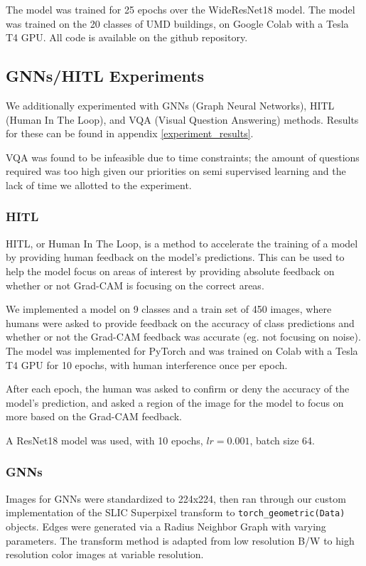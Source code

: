 \documentclass{article}
\begin{document}
The model was trained for 25 epochs over the WideResNet18 model. The model was trained on the 20 classes of UMD buildings, on Google Colab with a Tesla T4 GPU. All code is available on the github repository.

\subsection{GNNs/HITL Experiments}

We additionally experimented with GNNs (Graph Neural Networks), HITL (Human In The Loop), and VQA (Visual Question Answering) methods. Results for these can be found in appendix \ref{experiment_results}.

VQA was found to be infeasible due to time constraints; the amount of questions required was too high given our priorities on semi supervised learning and the lack of time we allotted to the experiment.

\subsubsection{HITL}

HITL, or Human In The Loop, is a method to accelerate the training of a model by providing human feedback on the model's predictions. This can be used to help the model focus on areas of interest by providing absolute feedback on whether or not Grad-CAM is focusing on the correct areas.

We implemented a model on 9 classes and a train set of 450 images, where humans were asked to provide feedback on the accuracy of class predictions and whether or not the Grad-CAM feedback was accurate (eg. not focusing on noise). The model was implemented for PyTorch and was trained on Colab with a Tesla T4 GPU for 10 epochs, with human interference once per epoch. 

After each epoch, the human was asked to confirm or deny the accuracy of the model's prediction, and asked a region of the image for the model to focus on more based on the Grad-CAM feedback.

A ResNet18 model was used, with 10 epochs, $lr=0.001$, batch size 64. 

\subsubsection{GNNs}

Images for GNNs were standardized to 224x224, then ran through our custom implementation of the SLIC Superpixel transform to \verb*|torch_geometric(Data)| objects. Edges were generated via a Radius Neighbor Graph with varying parameters. The transform method is adapted from low resolution B/W to high resolution color images at variable resolution.
\end{document}

